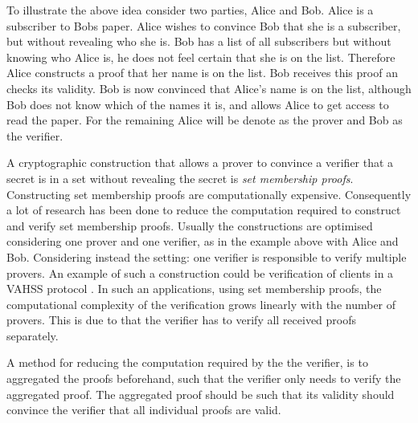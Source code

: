 
To illustrate the above idea consider two parties, Alice and Bob. Alice is a subscriber to Bobs paper. Alice wishes to convince Bob that she is a subscriber, but without revealing who she is. Bob has a list of all subscribers but without knowing who Alice is, he does not feel certain that she is on the list. Therefore Alice constructs a proof that her name is on the list. Bob receives this proof an checks its validity. Bob is now convinced that Alice's name is on the list, although Bob does not know which of the names it is, and allows Alice to get access to read the paper.  For the remaining Alice will be denote as the prover and Bob as the verifier.

A cryptographic construction that allows a prover to convince a verifier that a secret is in a set without revealing the secret is \textit{set membership proofs}.  %
Constructing set membership proofs are computationally expensive. Consequently a lot of research has been done to reduce the computation required to construct and verify set membership proofs. Usually the constructions are optimised considering  one prover  and one verifier, as in the example above with Alice and Bob. Considering instead the setting: one verifier is responsible to verify multiple provers. An example of such a construction could be verification of clients in a VAHSS protocol \cite{SumItUp}. In such an applications, using set membership proofs, the computational complexity of the verification grows linearly with the number of provers. This is due to that the verifier has to verify all received proofs separately.  %

A method for reducing the computation required by the the verifier, is to aggregated the proofs beforehand, such that the verifier only needs to verify the aggregated proof. The aggregated proof should be such that its validity should convince the verifier that all individual proofs are valid. 


